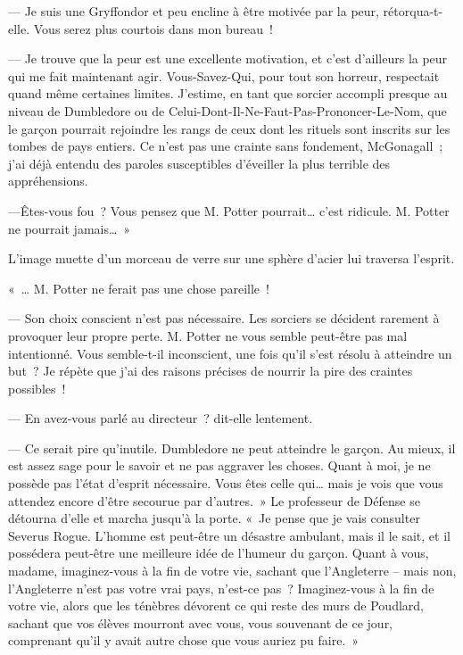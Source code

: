 --- Je suis une Gryffondor et peu encline à être motivée par la peur, rétorqua-t-elle.
Vous serez plus courtois dans mon bureau~!

--- Je trouve que la peur est une excellente motivation, et c'est d'ailleurs la peur qui me fait maintenant agir.
Vous-Savez-Qui, pour tout son horreur, respectait quand même certaines limites.
J'estime, en tant que sorcier accompli presque au niveau de Dumbledore ou de Celui-Dont-Il-Ne-Faut-Pas-Prononcer-Le-Nom, que le garçon pourrait rejoindre les rangs de ceux dont les rituels sont inscrits sur les tombes de pays entiers.
Ce n'est pas une crainte sans fondement, McGonagall~; j'ai déjà entendu des paroles susceptibles d'éveiller la plus terrible des appréhensions.

---Êtes-vous fou~?
Vous pensez que M. Potter pourrait… c'est ridicule.
M. Potter ne pourrait jamais…~»

L'image muette d'un morceau de verre sur une sphère d'acier lui traversa l'esprit.

«~… M. Potter ne ferait pas une chose pareille~!

--- Son choix conscient n'est pas nécessaire.
Les sorciers se décident rarement à provoquer leur propre perte.
M. Potter ne vous semble peut-être pas mal intentionné.
Vous semble-t-il inconscient, une fois qu'il s'est résolu à atteindre un but~?
Je répète que j'ai des raisons précises de nourrir la pire des craintes possibles~!

--- En avez-vous parlé au directeur~? dit-elle lentement.

--- Ce serait pire qu'inutile.
Dumbledore ne peut atteindre le garçon.
Au mieux, il est assez sage pour le savoir et ne pas aggraver les choses.
Quant à moi, je ne possède pas l'état d'esprit nécessaire.
Vous êtes celle qui… mais je vois que vous attendez encore d'être secourue par d'autres.~»
Le professeur de Défense se détourna d'elle et marcha jusqu'à la porte.
«~Je pense que je vais consulter Severus Rogue.
L'homme est peut-être un désastre ambulant, mais il le sait, et il possédera peut-être une meilleure idée de l'humeur du garçon.
Quant à vous, madame, imaginez-vous à la fin de votre vie, sachant que l'Angleterre -- mais non, l'Angleterre n'est pas votre vrai pays, n'est-ce pas~?
Imaginez-vous à la fin de votre vie, alors que les ténèbres dévorent ce qui reste des murs de Poudlard, sachant que vos élèves mourront avec vous, vous souvenant de ce jour, comprenant qu'il y avait autre chose que vous auriez pu faire.~»

